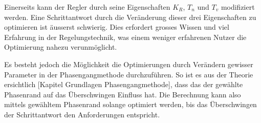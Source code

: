 Einerseits kann der Regler durch seine Eigenschaften $K_R$, $T_n$ und $T_v$ modifiziert werden. Eine Schrittantwort durch die Veränderung dieser drei Eigenschaften zu optimieren ist äusserst schwierig. Dies erfordert grosses Wissen und viel Erfahrung in der Regelungstechnik, was einem weniger erfahrenen Nutzer die Optimierung nahezu verunmöglicht.

Es besteht jedoch die Möglichkeit die Optimierungen durch Verändern gewisser Parameter in der Phasengangmethode durchzuführen. So ist es aus der Theorie ersichtlich [Kapitel Grundlagen Phasengangmethode], dass das der gewählte Phasenrand auf das Überschwingen Einfluss hat. Die Berechnung kann also mittels gewähltem Phasenrand solange optimiert werden, bis das Überschwingen der Schrittantwort den Anforderungen entspricht.
